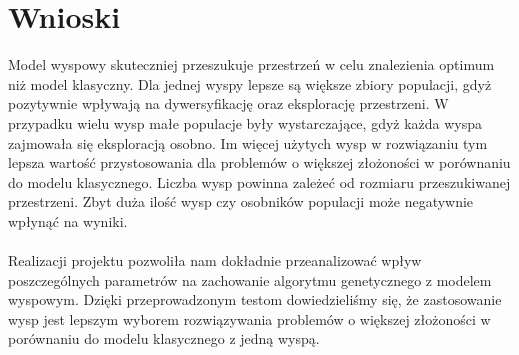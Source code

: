 \documentclass[12pt,a4paper]{article}
\begin{document}
\section*{Wnioski}
Model wyspowy skuteczniej przeszukuje przestrzeń w celu znalezienia optimum niż model klasyczny. Dla jednej wyspy lepsze są większe zbiory populacji, gdyż pozytywnie wpływają na dywersyfikację oraz eksplorację przestrzeni. W przypadku wielu wysp małe populacje były wystarczające, gdyż każda wyspa zajmowała się eksploracją osobno. Im więcej użytych wysp w rozwiązaniu tym lepsza wartość przystosowania dla problemów o większej złożoności w porównaniu do modelu klasycznego. Liczba wysp powinna zależeć od rozmiaru przeszukiwanej przestrzeni. Zbyt duża ilość wysp czy osobników populacji może negatywnie wpłynąć na wyniki.
\\
\\
Realizacji projektu pozwoliła nam dokładnie przeanalizować wpływ poszczególnych parametrów na zachowanie algorytmu genetycznego z modelem wyspowym. Dzięki przeprowadzonym testom dowiedzieliśmy się, że zastosowanie wysp jest lepszym wyborem rozwiązywania problemów o większej złożoności w porównaniu do modelu klasycznego z jedną wyspą.

\nocite{*}

{}
\end{document}
